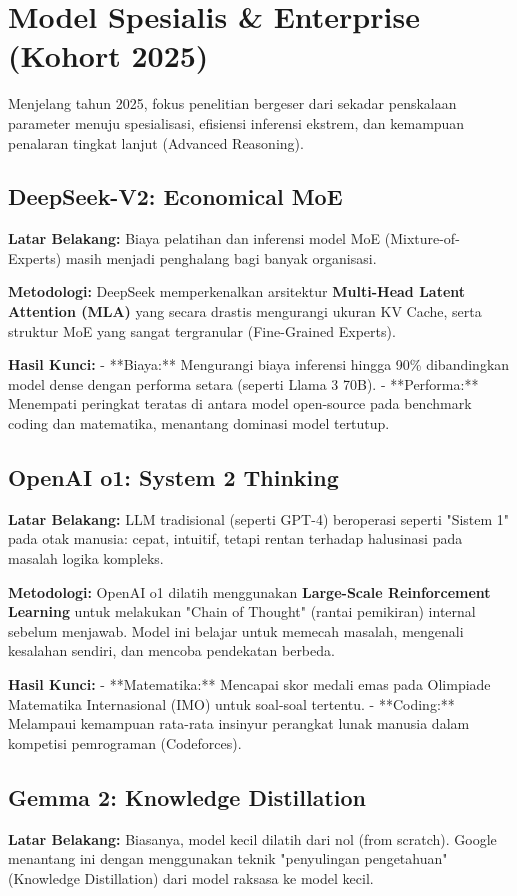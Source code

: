 \section{Model Spesialis \& Enterprise (Kohort 2025)}

Menjelang tahun 2025, fokus penelitian bergeser dari sekadar penskalaan parameter menuju spesialisasi, efisiensi inferensi ekstrem, dan kemampuan penalaran tingkat lanjut (Advanced Reasoning).

\subsection{DeepSeek-V2: Economical MoE \cite{deepseek2024v2}}
\textbf{Latar Belakang:}
Biaya pelatihan dan inferensi model MoE (Mixture-of-Experts) masih menjadi penghalang bagi banyak organisasi.

\textbf{Metodologi:}
DeepSeek memperkenalkan arsitektur \textbf{Multi-Head Latent Attention (MLA)} yang secara drastis mengurangi ukuran KV Cache, serta struktur MoE yang sangat tergranular (Fine-Grained Experts).

\textbf{Hasil Kunci:}
- **Biaya:** Mengurangi biaya inferensi hingga 90\% dibandingkan model dense dengan performa setara (seperti Llama 3 70B).
- **Performa:** Menempati peringkat teratas di antara model open-source pada benchmark coding dan matematika, menantang dominasi model tertutup.

\subsection{OpenAI o1: System 2 Thinking \cite{openai2024o1}}
\textbf{Latar Belakang:}
LLM tradisional (seperti GPT-4) beroperasi seperti "Sistem 1" pada otak manusia: cepat, intuitif, tetapi rentan terhadap halusinasi pada masalah logika kompleks.

\textbf{Metodologi:}
OpenAI o1 dilatih menggunakan \textbf{Large-Scale Reinforcement Learning} untuk melakukan "Chain of Thought" (rantai pemikiran) internal sebelum menjawab. Model ini belajar untuk memecah masalah, mengenali kesalahan sendiri, dan mencoba pendekatan berbeda.

\textbf{Hasil Kunci:}
- **Matematika:** Mencapai skor medali emas pada Olimpiade Matematika Internasional (IMO) untuk soal-soal tertentu.
- **Coding:** Melampaui kemampuan rata-rata insinyur perangkat lunak manusia dalam kompetisi pemrograman (Codeforces).

\subsection{Gemma 2: Knowledge Distillation \cite{google2024gemma2}}
\textbf{Latar Belakang:}
Biasanya, model kecil dilatih dari nol (from scratch). Google menantang ini dengan menggunakan teknik "penyulingan pengetahuan" (Knowledge Distillation) dari model raksasa ke model kecil.

